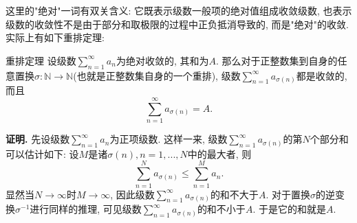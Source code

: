 这里的"绝对"一词有双关含义: 它既表示级数一般项的绝对值组成收敛级数, 也表示级数的收敛性不是由于部分和取极限的过程中正负抵消导致的, 而是"绝对"的收敛. 实际上有如下重排定理:

\begin{theorem}{重排定理}
设级数$\sum_{n=1}^\infty a_n$为绝对收敛的, 其和为$A$. 那么对于正整数集到自身的任意置换$\sigma:\mathbb{N}\to\mathbb{N}$(也就是正整数集自身的一个重排), 级数$\sum_{n=1}^\infty a_{\sigma(n)}$都是收敛的, 而且
$$
\sum_{n=1}^\infty a_{\sigma(n)}=A.
$$
\end{theorem}

\textbf{证明.} 先设级数$\sum_{n=1}^\infty a_n$为正项级数. 这样一来, 级数$\sum_{n=1}^\infty a_{\sigma(n)}$的第$N$个部分和可以估计如下: 设$M$是诸$\sigma(n),n=1,...,N$中的最大者, 则
$$
\sum_{n=1}^Na_{\sigma(n)}\leq\sum_{n=1}^{M}a_n.
$$
显然当$N\to\infty$时$M\to\infty$, 因此级数$\sum_{n=1}^\infty a_{\sigma(n)}$的和不大于$A$. 对于置换$\sigma$的逆变换$\sigma^{-1}$进行同样的推理, 可见级数$\sum_{n=1}^\infty a_{\sigma(n)}$的和不小于$A$. 于是它的和就是$A$.